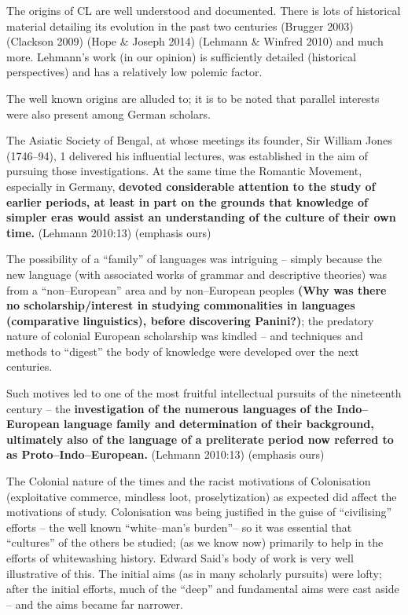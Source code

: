 The origins of CL are well understood and documented. There is lots of historical material detailing its evolution in the past two centuries (Brugger 2003) (Clackson 2009) (Hope \& Joseph 2014) (Lehmann \& Winfred 2010) and much more. Lehmann’s work (in our opinion) is sufficiently detailed (historical perspectives) and has a relatively low polemic factor.

The well known origins are alluded to; it is to be noted that parallel interests were also present among German scholars.

\begin{myquote}
The Asiatic Society of Bengal, at whose meetings its founder, Sir William Jones (1746–94), 1 delivered his influential lectures, was established in the aim of pursuing those investigations. At the same time the Romantic Movement, especially in Germany, \textbf{devoted considerable attention to the study of earlier periods, at least in part on the grounds that knowledge of simpler eras would assist an understanding of the culture of their own time.} (Lehmann 2010:13) (emphasis ours)
\end{myquote}

\newpage

The possibility of a “family” of languages was intriguing – simply because the new language (with associated works of grammar and descriptive theories) was from a “non–European” area and by non–European peoples \textbf{(Why was there no scholarship/interest in studying commonalities in languages (comparative linguistics), before discovering Panini?)}; the predatory nature of colonial European scholarship was kindled – and techniques and methods to “digest” the body of knowledge were developed over the next centuries.

\begin{myquote}
Such motives led to one of the most fruitful intellectual pursuits of the nineteenth century – the \textbf{investigation of the numerous languages of the Indo–European language family and determination of their background, ultimately also of the language of a preliterate period now referred to as Proto–Indo–European. } (Lehmann 2010:13) (emphasis ours)
\end{myquote}

The Colonial nature of the times and the racist motivations of Colonisation (exploitative commerce, mindless loot, proselytization) as expected did affect the motivations of study. Colonisation was being justified in the guise of “civilising” efforts – the well known “white–man’s burden”– so it was essential that “cultures” of the others be studied; (as we know now) primarily to help in the efforts of whitewashing history. Edward Said’s body of work is very well illustrative of this. The initial aims (as in many scholarly pursuits) were lofty; after the initial efforts, much of the “deep” and fundamental aims were cast aside – and the aims became far narrower.

